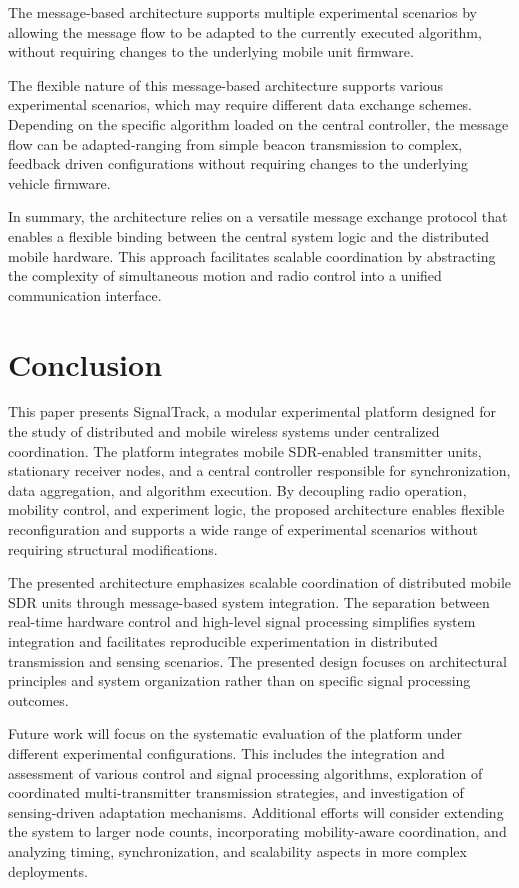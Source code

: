 \documentclass[conference,a4paper]{IEEEtran}
\begin{document}
The message-based architecture supports multiple experimental scenarios by allowing
the message flow to be adapted to the currently executed algorithm, without requiring
changes to the underlying mobile unit firmware.


The flexible nature of this message-based architecture supports various experimental scenarios, which may require different data exchange schemes. Depending on the specific algorithm loaded on the central controller, the message flow can be adapted-ranging from simple beacon transmission to complex, feedback driven configurations without requiring changes to the underlying vehicle firmware.



In summary, the architecture relies on a versatile message exchange protocol that enables a flexible binding between the central system logic and the distributed mobile hardware. This approach facilitates scalable coordination by abstracting the complexity of simultaneous motion and radio control into a unified communication interface. 



\section{Conclusion}
\label{sec:conclusions}

This paper presents SignalTrack, a modular experimental platform designed for the study of distributed and mobile wireless systems under centralized coordination. The platform integrates mobile SDR-enabled transmitter units, stationary receiver nodes, and a central controller responsible for synchronization, data aggregation, and algorithm execution. By decoupling radio operation, mobility control, and experiment logic, the proposed architecture enables flexible reconfiguration and supports a wide range of experimental scenarios without requiring structural modifications.

The presented architecture emphasizes scalable coordination of distributed mobile SDR units through message-based system integration. The separation between real-time hardware control and high-level signal processing simplifies system integration and facilitates reproducible experimentation in distributed transmission and sensing scenarios. The presented design focuses on architectural principles and system organization rather than on specific signal processing outcomes.

Future work will focus on the systematic evaluation of the platform under different experimental configurations. This includes the integration and assessment of various control and signal processing algorithms, exploration of coordinated multi-transmitter transmission strategies, and investigation of sensing-driven adaptation mechanisms. Additional efforts will consider extending the system to larger node counts, incorporating mobility-aware coordination, and analyzing timing, synchronization, and scalability aspects in more complex deployments.
\end{document}
